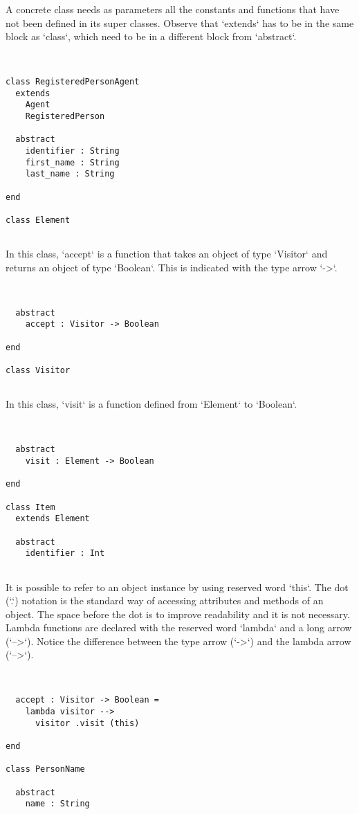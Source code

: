 \documentclass[12pt,a4paper]{article}
\begin{document}
A concrete class needs as parameters all the constants and functions that have not been
defined in its super classes. Observe that `extends` has to be in the same block as
`class`, which need to be in a different block from `abstract`.


\begin{lstlisting}


class RegisteredPersonAgent
  extends
    Agent
    RegisteredPerson

  abstract
    identifier : String
    first_name : String
    last_name : String

end

class Element


\end{lstlisting}

In this class, `accept` is a function that takes an object of type `Visitor` and returns
an object of type `Boolean`. This is indicated with the type arrow `->`.


\begin{lstlisting}


  abstract
    accept : Visitor -> Boolean

end

class Visitor


\end{lstlisting}

In this class, `visit` is a function defined from `Element` to `Boolean`.


\begin{lstlisting}


  abstract
    visit : Element -> Boolean

end

class Item
  extends Element

  abstract
    identifier : Int


\end{lstlisting}

It is possible to refer to an object instance by using reserved word `this`.
The dot (`.`) notation is the standard way of accessing attributes and methods of an
object. The space before the dot is to improve readability and it is not necessary.
Lambda functions are declared with the reserved word `lambda` and a long arrow (`-->`).
Notice the difference between the type arrow (`->`) and the lambda arrow (`-->`).


\begin{lstlisting}


  accept : Visitor -> Boolean =
    lambda visitor -->
      visitor .visit (this)

end

class PersonName

  abstract
    name : String


\end{lstlisting}
\end{document}
